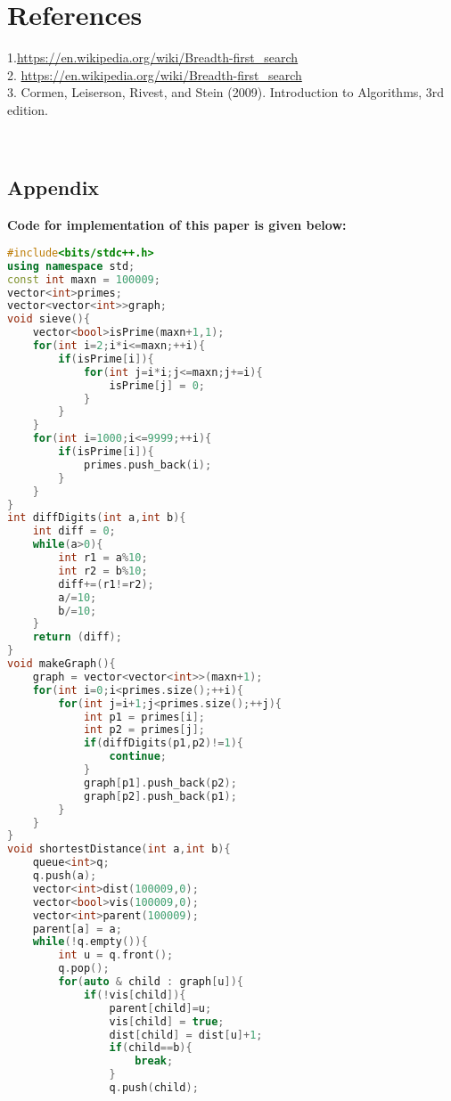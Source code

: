 \documentclass[conference]{IEEEtran}
\begin{document}
 \section{References}
\color{blue}1.{\url{https://en.wikipedia.org/wiki/Breadth-first_search} }\\
2. {\url{https://en.wikipedia.org/wiki/Breadth-first_search}}\\
3. Cormen, Leiserson, Rivest, and Stein (2009). Introduction to Algorithms, 3rd edition.

\color{black}
\
\begin{titlepage}
    \begin{center}
        \Huge
        \section*{Appendix}
        \end{center}
         \textbf{Code for implementation of this paper is given below:}
\begin{lstlisting}[language=C++,caption=Code for this paper]
#include<bits/stdc++.h>
using namespace std;
const int maxn = 100009;
vector<int>primes;
vector<vector<int>>graph;
void sieve(){
    vector<bool>isPrime(maxn+1,1);
    for(int i=2;i*i<=maxn;++i){
        if(isPrime[i]){
            for(int j=i*i;j<=maxn;j+=i){
                isPrime[j] = 0;
            }
        }
    }
    for(int i=1000;i<=9999;++i){
        if(isPrime[i]){
            primes.push_back(i);
        }
    }
}
int diffDigits(int a,int b){
    int diff = 0;
    while(a>0){
        int r1 = a%10;
        int r2 = b%10;
        diff+=(r1!=r2);
        a/=10;
        b/=10;
    }
    return (diff);
}
void makeGraph(){
    graph = vector<vector<int>>(maxn+1);
    for(int i=0;i<primes.size();++i){
        for(int j=i+1;j<primes.size();++j){
            int p1 = primes[i];
            int p2 = primes[j];
            if(diffDigits(p1,p2)!=1){
                continue;
            }
            graph[p1].push_back(p2);
            graph[p2].push_back(p1);
        }
    }
}
void shortestDistance(int a,int b){
    queue<int>q;
    q.push(a);
    vector<int>dist(100009,0);
    vector<bool>vis(100009,0);
    vector<int>parent(100009);
    parent[a] = a;
    while(!q.empty()){
        int u = q.front();
        q.pop();
        for(auto & child : graph[u]){
            if(!vis[child]){
                parent[child]=u;
                vis[child] = true;
                dist[child] = dist[u]+1;
                if(child==b){
                    break;
                }
                q.push(child);

\end{lstlisting}
\end{titlepage}
\end{document}
